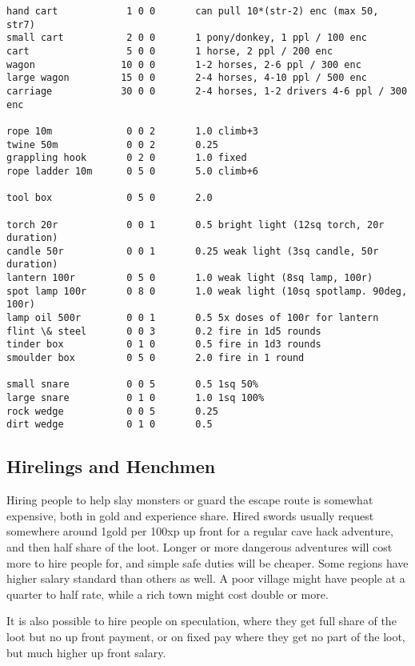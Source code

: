 \begin{verbatim}
hand cart            1 0 0       can pull 10*(str-2) enc (max 50, str7)
small cart           2 0 0       1 pony/donkey, 1 ppl / 100 enc
cart                 5 0 0       1 horse, 2 ppl / 200 enc
wagon               10 0 0       1-2 horses, 2-6 ppl / 300 enc
large wagon         15 0 0       2-4 horses, 4-10 ppl / 500 enc
carriage            30 0 0       2-4 horses, 1-2 drivers 4-6 ppl / 300 enc

rope 10m             0 0 2       1.0 climb+3
twine 50m            0 0 2       0.25
grappling hook       0 2 0       1.0 fixed
rope ladder 10m      0 5 0       5.0 climb+6

tool box             0 5 0       2.0

torch 20r            0 0 1       0.5 bright light (12sq torch, 20r duration)
candle 50r           0 0 1       0.25 weak light (3sq candle, 50r duration)
lantern 100r         0 5 0       1.0 weak light (8sq lamp, 100r)
spot lamp 100r       0 8 0       1.0 weak light (10sq spotlamp. 90deg, 100r)
lamp oil 500r        0 0 1       0.5 5x doses of 100r for lantern
flint \& steel       0 0 3       0.2 fire in 1d5 rounds
tinder box           0 1 0       0.5 fire in 1d3 rounds
smoulder box         0 5 0       2.0 fire in 1 round

small snare          0 0 5       0.5 1sq 50%
large snare          0 1 0       1.0 1sq 100%
rock wedge           0 0 5       0.25
dirt wedge           0 1 0       0.5

\end{verbatim} %
\normalsize



\subsection*{Hirelings and Henchmen}
Hiring people to help slay monsters or guard the escape route is somewhat expensive, both in gold and experience share. Hired swords usually request somewhere around 1gold per 100xp up front for a regular cave hack adventure, and then half share of the loot. Longer or more dangerous adventures will cost more to hire people for, and simple safe duties will be cheaper. Some regions have higher salary standard than others as well. A poor village might have people at a quarter to half rate, while a rich town might cost double or more.

It is also possible to hire people on speculation, where they get full share of the loot but no up front payment, or on fixed pay where they get no part of the loot, but much higher up front salary.

